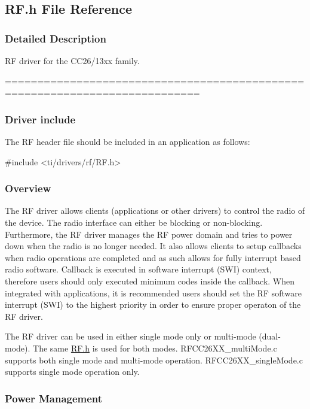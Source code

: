\subsection{R\+F.\+h File Reference}
\label{_r_f_8h}


\subsubsection{Detailed Description}
R\+F driver for the C\+C26/13xx family. 

============================================================================

\subsubsection*{Driver include}

The R\+F header file should be included in an application as follows\+: 
\begin{DoxyCode}
\textcolor{preprocessor}{#include <ti/drivers/rf/RF.h>}
\end{DoxyCode}


\subsubsection*{Overview}

The R\+F driver allows clients (applications or other drivers) to control the radio of the device. The radio interface can either be blocking or non-\/blocking. Furthermore, the R\+F driver manages the R\+F power domain and tries to power down when the radio is no longer needed. It also allows clients to setup callbacks when radio operations are completed and as such allows for fully interrupt based radio software. Callback is executed in software interrupt (S\+W\+I) context, therefore users should only executed minimum codes inside the callback. When integrated with applications, it is recommended users should set the R\+F software interrupt (S\+W\+I) to the highest priority in order to ensure proper operaton of the R\+F driver.

The R\+F driver can be used in either single mode only or multi-\/mode (dual-\/mode). The same \hyperlink{_r_f_8h}{R\+F.\+h} is used for both modes. R\+F\+C\+C26\+X\+X\+\_\+multi\+Mode.\+c supports both single mode and multi-\/mode operation. R\+F\+C\+C26\+X\+X\+\_\+single\+Mode.\+c supports single mode operation only.

\subsubsection*{Power Management}


